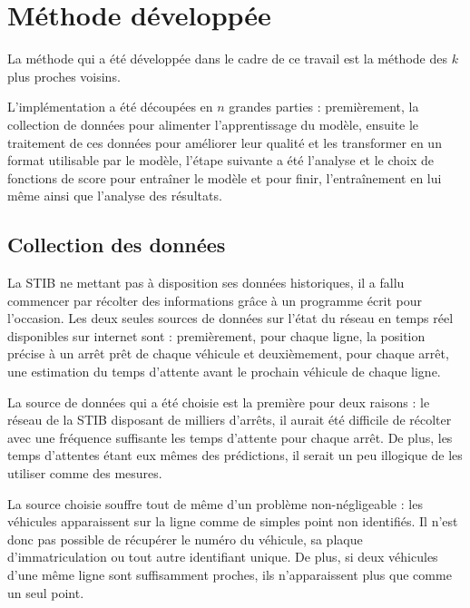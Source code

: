 \documentclass[letterpaper]{article}
\begin{document}


\section{Méthode développée}

La méthode qui a été développée dans le cadre de ce travail est la méthode des $k$ plus proches voisins.


L'implémentation a été découpées en $n$ grandes parties : premièrement, la collection de données pour alimenter l'apprentissage du modèle, ensuite le traitement de ces données pour améliorer leur qualité et les transformer en un format utilisable par le modèle, l'étape suivante a été l'analyse et le choix de fonctions de score pour entraîner le modèle et pour finir, l’entraînement en lui même ainsi que l'analyse des résultats.

\subsection{Collection des données}

La STIB ne mettant pas à disposition ses données historiques, il a fallu commencer par récolter des informations grâce à un programme écrit pour l'occasion. Les deux seules sources de données sur l'état du réseau en temps réel disponibles sur internet sont : premièrement, pour chaque ligne, la position précise à un arrêt prêt de chaque véhicule et deuxièmement, pour chaque arrêt, une estimation du temps d'attente avant le prochain véhicule de chaque ligne.

La source de données qui a été choisie est la première pour deux raisons : le réseau de la STIB disposant de milliers d'arrêts, il aurait été difficile de récolter avec une fréquence suffisante les temps d'attente pour chaque arrêt. De plus, les temps d'attentes étant eux mêmes des prédictions, il serait un peu illogique de les utiliser comme des mesures.

La source choisie souffre tout de même d'un problème non-négligeable : les véhicules apparaissent sur la ligne comme de simples point non identifiés. Il n'est donc pas possible de récupérer le numéro du véhicule, sa plaque d'immatriculation ou tout autre identifiant unique. De plus, si deux véhicules d'une même ligne sont suffisamment proches, ils n'apparaissent plus que comme un seul point.
\end{document}
